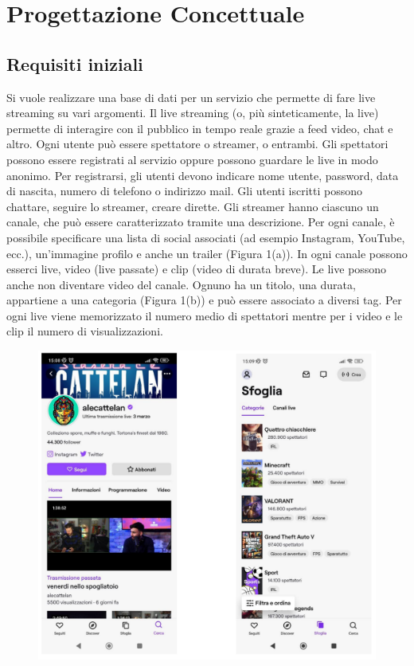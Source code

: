 

\section{Progettazione Concettuale}
\subsection{Requisiti iniziali}
Si vuole realizzare una base di dati per un servizio che permette di fare live streaming su vari
argomenti. Il live streaming (o, più sinteticamente, la live) permette di interagire con il pubblico in
tempo reale grazie a feed video, chat e altro.
Ogni utente può essere spettatore o streamer, o entrambi. Gli spettatori possono essere registrati
al servizio oppure possono guardare le live in modo anonimo. Per registrarsi, gli utenti devono
indicare nome utente, password, data di nascita, numero di telefono o indirizzo mail. Gli utenti
iscritti possono chattare, seguire lo streamer, creare dirette.
Gli streamer hanno ciascuno un canale, che può essere caratterizzato tramite una descrizione. Per
ogni canale, è possibile specificare una lista di social associati (ad esempio Instagram, YouTube,
ecc.), un’immagine profilo e anche un trailer (Figura 1(a)). In ogni canale possono esserci live,
video (live passate) e clip (video di durata breve). Le live possono anche non diventare video del
canale. Ognuno ha un titolo, una durata, appartiene a una categoria (Figura 1(b)) e può essere
associato a diversi tag. Per ogni live viene memorizzato il numero medio di spettatori mentre per i
video e le clip il numero di visualizzazioni.

\begin{figure}[h]
    \centering
    \includegraphics[width=0.5\linewidth]{img/twitch.png}
\end{figure}

